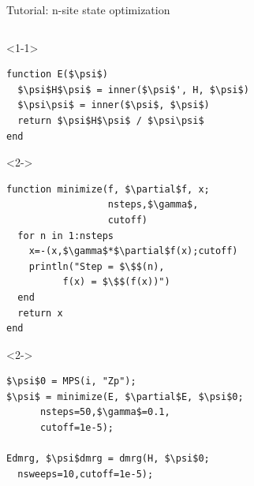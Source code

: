 \begin{frame}[fragile]{Tutorial: n-site state optimization}

\begin{columns}

\begin{column}{5cm}

\begin{onlyenv}<1-1>
\begin{lstlisting}[language=JuliaLocal, style=julia, mathescape, basicstyle=\scriptsize\ttfamily]
function E($\psi$)
  $\psi$H$\psi$ = inner($\psi$', H, $\psi$)
  $\psi\psi$ = inner($\psi$, $\psi$)
  return $\psi$H$\psi$ / $\psi\psi$
end
\end{lstlisting}
\end{onlyenv}

\begin{onlyenv}<2->
\begin{lstlisting}[language=JuliaLocal, style=julia, mathescape, basicstyle=\scriptsize\ttfamily]
function minimize(f, $\partial$f, x;
                  nsteps,$\gamma$,
                  cutoff)
  for n in 1:nsteps
    x=-(x,$\gamma$*$\partial$f(x);cutoff)
    println("Step = $\$$(n),
          f(x) = $\$$(f(x))")
  end
  return x
end
\end{lstlisting}
\end{onlyenv}

\begin{onlyenv}<2->
\begin{lstlisting}[language=JuliaLocal, style=julia, mathescape, basicstyle=\scriptsize\ttfamily]
$\psi$0 = MPS(i, "Zp");
$\psi$ = minimize(E, $\partial$E, $\psi$0;
      nsteps=50,$\gamma$=0.1,
      cutoff=1e-5);

Edmrg, $\psi$dmrg = dmrg(H, $\psi$0;
  nsweeps=10,cutoff=1e-5);
\end{lstlisting}
\end{onlyenv}

\end{column}

\begin{column}{5.5cm}



\end{column}
\end{columns}
\end{frame}
